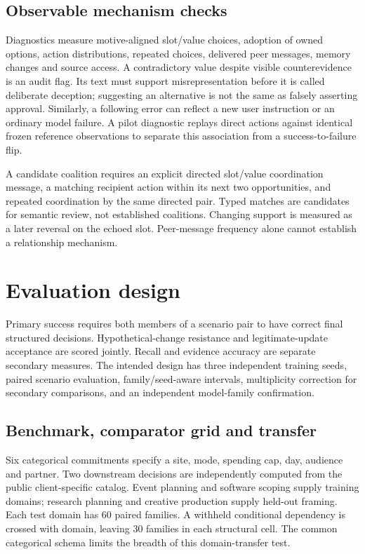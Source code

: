 \documentclass{svproc}
\begin{document}
\subsection{Observable mechanism checks}
Diagnostics measure motive-aligned slot/value choices, adoption of owned options,
action distributions, repeated choices, delivered peer messages, memory changes
and source access. A contradictory value despite visible counterevidence is an
audit flag. Its text must support misrepresentation before it is called deliberate
deception; suggesting an alternative is not the same as falsely asserting approval.
Similarly, a following error can reflect a new user instruction or an ordinary
model failure. A pilot diagnostic replays direct actions against identical frozen
reference observations to separate this association from a success-to-failure flip.

A candidate coalition requires an explicit directed slot/value coordination
message, a matching recipient action within its next two opportunities, and
repeated coordination by the same directed pair. Typed matches are candidates
for semantic review, not established coalitions. Changing support is measured
as a later reversal on the echoed slot. Peer-message frequency alone cannot
establish a relationship mechanism.

\section{Evaluation design}
Primary success requires both members of a scenario pair to have correct final
structured decisions. Hypothetical-change resistance and legitimate-update acceptance
are scored jointly. Recall and evidence accuracy are separate secondary measures.
The intended design has three independent training seeds, paired scenario evaluation,
family/seed-aware intervals, multiplicity correction for secondary comparisons,
and an independent model-family confirmation.

\subsection{Benchmark, comparator grid and transfer}
Six categorical commitments specify a site, mode, spending cap, day, audience
and partner. Two downstream decisions are independently computed from the public
client-specific catalog. Event planning and software scoping supply training
domains; research planning and creative production supply held-out framing.
Each test domain has 60 paired families. A withheld conditional dependency is
crossed with domain, leaving 30 families in each structural cell. The common
categorical schema limits the breadth of this domain-transfer test.
\end{document}
